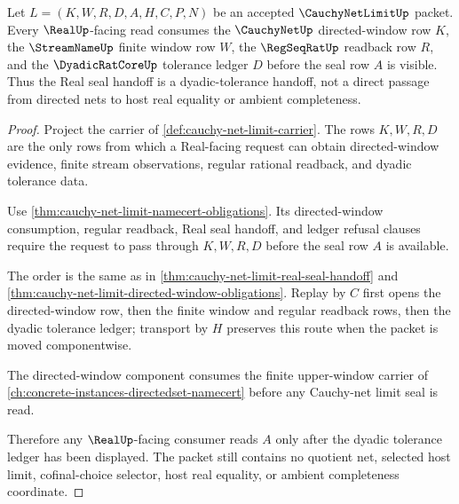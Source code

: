 \begin{theorem}
\label{thm:cauchy-net-limit-dyadic-tolerance-handoff}
Let $L=(K,W,R,D,A,H,C,P,N)$ be an accepted $\CauchyNetLimitUp$ packet. Every $\RealUp$-facing read consumes the $\CauchyNetUp$ directed-window row $K$, the $\StreamNameUp$ finite window row $W$, the $\RegSeqRatUp$ readback row $R$, and the $\DyadicRatCoreUp$ tolerance ledger $D$ before the seal row $A$ is visible. Thus the Real seal handoff is a dyadic-tolerance handoff, not a direct passage from directed nets to host real equality or ambient completeness.
\end{theorem}
\begin{proof}
Project the carrier of \autoref{def:cauchy-net-limit-carrier}. The rows $K,W,R,D$ are the only rows from which a Real-facing request can obtain directed-window evidence, finite stream observations, regular rational readback, and dyadic tolerance data.

Use \autoref{thm:cauchy-net-limit-namecert-obligations}. Its directed-window consumption, regular readback, Real seal handoff, and ledger refusal clauses require the request to pass through $K,W,R,D$ before the seal row $A$ is available.

The order is the same as in \autoref{thm:cauchy-net-limit-real-seal-handoff} and \autoref{thm:cauchy-net-limit-directed-window-obligations}. Replay by $C$ first opens the directed-window row, then the finite window and regular readback rows, then the dyadic tolerance ledger; transport by $H$ preserves this route when the packet is moved componentwise.

The directed-window component consumes the finite upper-window carrier of \autoref{ch:concrete-instances-directedset-namecert} before any Cauchy-net limit seal is read.

Therefore any $\RealUp$-facing consumer reads $A$ only after the dyadic tolerance ledger has been displayed. The packet still contains no quotient net, selected host limit, cofinal-choice selector, host real equality, or ambient completeness coordinate.
\end{proof}

